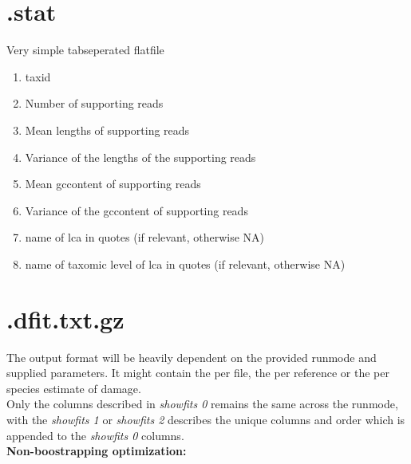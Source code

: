 \documentclass[10pt]{article}
\begin{document}
\section{.stat}\label{sec:stat}
Very simple tabseperated flatfile
\begin{enumerate}
\item taxid
\item Number of supporting reads
\item Mean lengths of supporting reads
\item Variance of the lengths of the supporting reads
\item Mean gccontent of supporting reads
\item Variance of the gccontent of supporting reads
\item name of lca in quotes (if relevant, otherwise NA)
\item name of taxomic level of lca in quotes (if relevant, otherwise NA)
\end{enumerate}
\clearpage
\section{.dfit.txt.gz}
The output format will be heavily dependent on the provided runmode and supplied parameters. It might contain the
per file, the per reference or the per species estimate of damage.\\ \noindent
Only the columns described in \textit{showfits 0} remains the same across the runmode, with the \textit{showfits 1} or \textit{showfits 2} describes the unique columns and order which is appended to the \textit{showfits 0} columns.\\ \noindent
\textbf{Non-boostrapping optimization:} \\ \noindent
\end{document}
